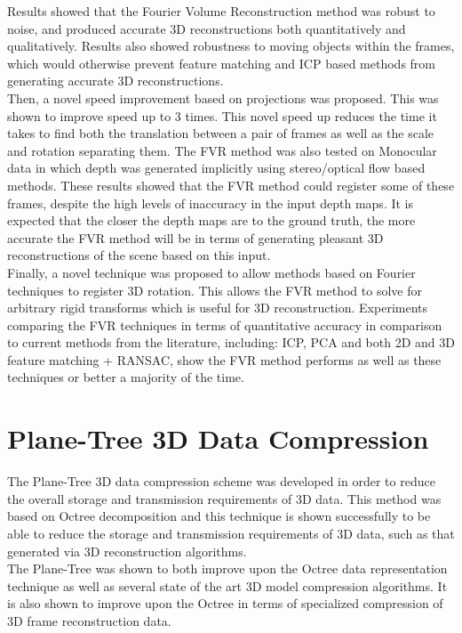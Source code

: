 Results showed that the Fourier Volume Reconstruction method was robust to noise, and produced accurate 3D reconstructions both quantitatively and qualitatively. Results also showed robustness to moving objects within the frames, which would otherwise prevent feature matching and ICP based methods from generating accurate 3D reconstructions. \\

Then, a novel speed improvement based on projections was proposed. This was shown to improve speed up to 3 times. This novel speed up reduces the time it takes to find both the translation between a pair of frames as well as the scale and rotation separating them. The FVR method was also tested on Monocular data in which depth was generated implicitly using stereo/optical flow based methods. These results showed that the FVR method could register some of these frames, despite the high levels of inaccuracy in the input depth maps. It is expected that the closer the depth maps are to the ground truth, the more accurate the FVR method will be in terms of generating pleasant 3D reconstructions of the scene based on this input. \\

Finally, a novel technique was proposed to allow methods based on Fourier techniques to register 3D rotation. This allows the FVR method to solve for arbitrary rigid transforms which is useful for 3D reconstruction. Experiments comparing the FVR techniques in terms of quantitative accuracy in comparison to current methods from the literature, including: ICP, PCA and both 2D and 3D feature matching + RANSAC, show the FVR method performs as well as these techniques or better a majority of the time.  \\

\section{Plane-Tree 3D Data Compression}
\label{Sec:ConcPT}

The Plane-Tree 3D data compression scheme was developed in order to reduce the overall storage and transmission requirements of 3D data. This method was based on Octree decomposition and this technique is shown successfully to be able to reduce the storage and transmission requirements of 3D data, such as that generated via 3D reconstruction algorithms. \\

The Plane-Tree was shown to both improve upon the Octree data representation technique as well as several state of the art 3D model compression algorithms. It is also shown to improve upon the Octree in terms of specialized compression of 3D frame reconstruction data. \\


